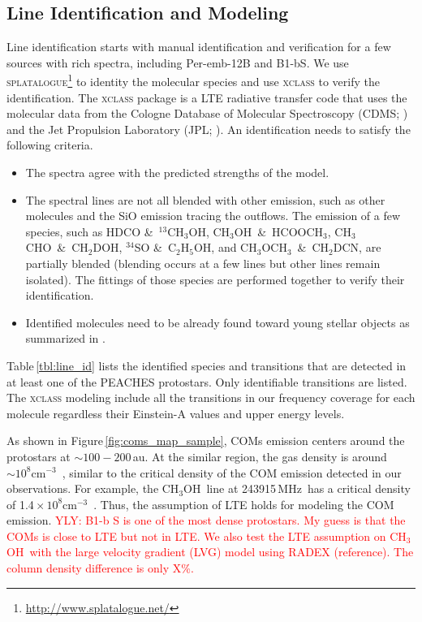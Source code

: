 \documentclass[twocolumn]{aastex62}
\newcommand{\mhz}{\mbox{\,MHz}}
\newcommand{\ee}[1]{\mbox{${} \times 10^{#1}$}}%
\newcommand{\cc}{\mbox{cm$^{-3}$}}
\newcommand{\methylformate}{\mbox{HCOOCH$_{3}$}}
\newcommand{\methanol}{\mbox{CH$_{3}$OH}}
\newcommand{\tmethanol}{\mbox{$^{13}$CH$_{3}$OH}}
\newcommand{\dmethanol}{\mbox{CH$_{2}$DOH}}
\newcommand{\dimethylether}{\mbox{CH$_{3}$OCH$_{3}$}}
\newcommand{\ethanol}{\mbox{C$_{2}$H$_{5}$OH}}
\newcommand{\acetaldehyde}{\mbox{CH$_{3}$CHO}}
\newcommand{\dmethylcyanide}{\mbox{CH$_{2}$DCN}}
\newcommand{\refnote}{\textcolor{red}{reference}}
\begin{document}
\subsection{Line Identification and Modeling}
\label{sec:modeling}
Line identification starts with manual identification and verification for a few sources with rich spectra, including Per-emb-12B and B1-bS.  We use \textsc{splatalogue}\footnote{\href{http://www.splatalogue.net/}{http://www.splatalogue.net/}} to identity the molecular species and use \textsc{xclass} \citep{2017A&A...598A...7M} to verify the identification.  The \textsc{xclass} package is a LTE radiative transfer code that uses the molecular data from the Cologne Database of Molecular Spectroscopy (CDMS; \citealt{2001A&A...370L..49M,2005JMoSt.742..215M,2016JMoSp.327...95E}) and the Jet Propulsion Laboratory (JPL; \citealt{1998JQSRT..60..883P}).  An identification needs to satisfy the following criteria.
\begin{itemize}
  \item The spectra agree with the predicted strengths of the model.
  \item The spectral lines are not all blended with other emission, such as other molecules and the SiO emission tracing the outflows.  The emission of a few species, such as HDCO \&\ \tmethanol, \methanol\ \&\ \methylformate, \acetaldehyde\ \&\ \dmethanol, $^{34}$SO \&\ \ethanol, and \dimethylether\ \&\ \dmethylcyanide, are partially blended (blending occurs at a few lines but other lines remain isolated).  The fittings of those species are performed together to verify their identification.
  \item Identified molecules need to be already found toward young stellar objects as summarized in \citet{2018ApJS..239...17M}.
\end{itemize}
Table\,\ref{tbl:line_id} lists the identified species and transitions that are detected in at least one of the PEACHES protostars.  Only identifiable transitions are listed.  The \textsc{xclass} modeling include all the transitions in our frequency coverage for each molecule regardless their Einstein-A values and upper energy levels.  

As shown in Figure\,\ref{fig:coms_map_sample}, COMs emission centers around the protostars at $\sim 100-200$\,au.  At the similar region, the gas density is around $\sim 10^{8}$\cc\ \citep[B1-b S: ][]{2017A&A...606A..35G}, similar to the critical density of the COM emission detected in our observations.  For example, the \methanol\ line at 243915\mhz\ has a critical density of 1.4\ee{8}\cc\ \citep{2005A&A...432..369S,2010MNRAS.406...95R}.  Thus, the assumption of LTE holds for modeling the COM emission.  \textcolor{red}{YLY: B1-b S is one of the most dense protostars.  My guess is that the COMs is close to LTE but not in LTE.  We also test the LTE assumption on \methanol\ with the large velocity gradient (LVG) model using RADEX (\refnote).  The column density difference is only X\%.}
\end{document}

